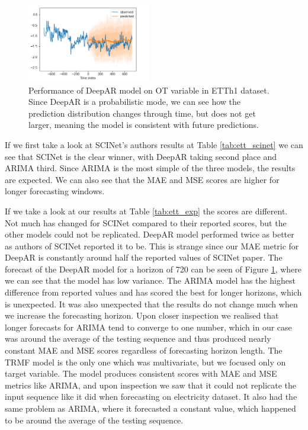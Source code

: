 \documentclass[conference]{IEEEtran}
\begin{document}
\begin{figure}[htb]
    \centering
    \includegraphics[width=0.48\textwidth]{deepar_eth.png}
    \caption{Performance of DeepAR model on OT variable in ETTh1 dataset. Since DeepAR is a probabilistic mode, we can see how the prediction distribution changes through time, but does not get larger, meaning the model is consistent with future predictions.}
    \label{fig:deepar_forecast}
\end{figure}

If we first take a look at SCINet's authors results at Table \ref{tab:ett_scinet} we can see that SCINet is the clear winner, with DeepAR taking second place and ARIMA third.
Since ARIMA is the most simple of the three models, the results are expected.
We can also see that the MAE and MSE scores are higher for longer forecasting windows.

If we take a look at our results at Table \ref{tab:ett_exp} the scores are different.
Not much has changed for SCINet compared to their reported scores, but the other models could not be replicated.
DeepAR model performed twice as better as authors of SCINet reported it to be.
This is strange since our MAE metric for DeepAR is constantly around half the reported values of SCINet paper.
The forecast of the DeepAR model for a horizon of 720 can be seen of Figure \ref{fig:deepar_forecast}, where we can see that the model has low variance.
The ARIMA model has the highest difference from reported values and has scored the best for longer horizons, which is unexpected.
It was also unexpected that the results do not change much when we increase the forecasting horizon.
Upon closer inspection we realised that longer forecasts for ARIMA tend to converge to one number, which in our case was around the average of the testing sequence and thus produced nearly constant MAE and MSE scores regardless of forecasting horizon length.
The TRMF model is the only one which was multivariate, but we focused only on target variable.
The model produces consistent scores with MAE and MSE metrics like ARIMA, and upon inspection we saw that it could not replicate the input sequence like it did when forecasting on electricity dataset.
It also had the same problem as ARIMA, where it forecasted a constant value, which happened to be around the average of the testing sequence.
\end{document}
